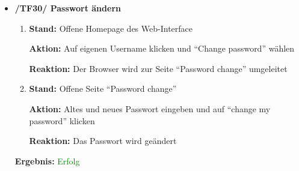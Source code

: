 \documentclass[a4paper]{scrreprt}
\begin{document}
\begin{itemize}
				\item \textbf{/TF30/ Passwort \"andern}
                        \begin{enumerate}
                            \item \par \textbf{Stand: }Offene Homepage des Web-Interface
                                \par \textbf{Aktion: }Auf eigenen Username klicken und ``Change password'' w\"ahlen
                                \par \textbf{Reaktion: }Der Browser wird zur Seite ``Password change'' umgeleitet
							\item \par \textbf{Stand: }Offene Seite ``Password change''
                                \par \textbf{Aktion: }Altes und neues Passwort eingeben und auf ``change my password'' klicken
                                \par \textbf{Reaktion: }Das Passwort wird ge\"andert
                        \end{enumerate}		
		           \vspace*{0.3cm}
		           \par \textbf{Ergebnis: }\textcolor{green}{Erfolg}
		           \vspace*{0.6cm}		
		

\end{itemize}
\end{document}
